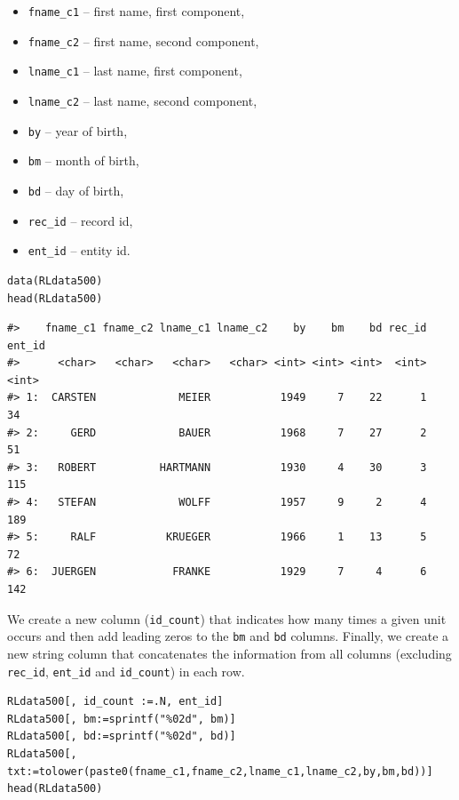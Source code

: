 \begin{itemize}
\tightlist
\item
  \texttt{fname\_c1} -- first name, first component,
\item
  \texttt{fname\_c2} -- first name, second component,
\item
  \texttt{lname\_c1} -- last name, first component,
\item
  \texttt{lname\_c2} -- last name, second component,
\item
  \texttt{by} -- year of birth,
\item
  \texttt{bm} -- month of birth,
\item
  \texttt{bd} -- day of birth,
\item
  \texttt{rec\_id} -- record id,
\item
  \texttt{ent\_id} -- entity id.
\end{itemize}

\begin{verbatim}
data(RLdata500)
head(RLdata500)
\end{verbatim}

\begin{verbatim}
#>    fname_c1 fname_c2 lname_c1 lname_c2    by    bm    bd rec_id ent_id
#>      <char>   <char>   <char>   <char> <int> <int> <int>  <int>  <int>
#> 1:  CARSTEN             MEIER           1949     7    22      1     34
#> 2:     GERD             BAUER           1968     7    27      2     51
#> 3:   ROBERT          HARTMANN           1930     4    30      3    115
#> 4:   STEFAN             WOLFF           1957     9     2      4    189
#> 5:     RALF           KRUEGER           1966     1    13      5     72
#> 6:  JUERGEN            FRANKE           1929     7     4      6    142
\end{verbatim}

We create a new column (\texttt{id\_count}) that indicates how many times a given unit occurs and then add leading zeros to the \texttt{bm} and \texttt{bd} columns. Finally, we create a new string column that concatenates the information from all columns (excluding \texttt{rec\_id}, \texttt{ent\_id} and \texttt{id\_count}) in each row.

\begin{verbatim}
RLdata500[, id_count :=.N, ent_id]
RLdata500[, bm:=sprintf("%02d", bm)]
RLdata500[, bd:=sprintf("%02d", bd)]
RLdata500[, txt:=tolower(paste0(fname_c1,fname_c2,lname_c1,lname_c2,by,bm,bd))]
head(RLdata500)
\end{verbatim}

